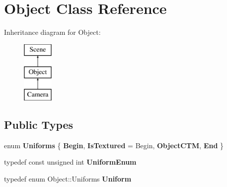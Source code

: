 \hypertarget{class_object}{\section{Object Class Reference}
\label{class_object}
}
Inheritance diagram for Object\-:\begin{figure}[H]
\begin{center}
\leavevmode
\includegraphics[height=3.000000cm]{class_object}
\end{center}
\end{figure}
\subsection*{Public Types}
\begin{DoxyCompactItemize}
\item 
enum {\bfseries Uniforms} \{ {\bfseries Begin}, 
{\bfseries Is\-Textured} =  Begin, 
{\bfseries Object\-C\-T\-M}, 
{\bfseries End}
 \}
\item 
\hypertarget{class_object_a79b74057dbc5182b85c9c3ba8480fcf2}{typedef const unsigned int {\bfseries Uniform\-Enum}}\label{class_object_a79b74057dbc5182b85c9c3ba8480fcf2}

\item 
\hypertarget{class_object_ae6a2969ddca87d2c54b7cb1c131a7d60}{typedef enum Object\-::\-Uniforms {\bfseries Uniform}}\label{class_object_ae6a2969ddca87d2c54b7cb1c131a7d60}

\end{DoxyCompactItemize}
